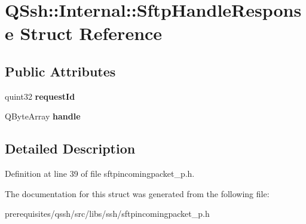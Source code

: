 \hypertarget{struct_q_ssh_1_1_internal_1_1_sftp_handle_response}{}\section{Q\+Ssh\+:\+:Internal\+:\+:Sftp\+Handle\+Response Struct Reference}
\label{struct_q_ssh_1_1_internal_1_1_sftp_handle_response}
\subsection*{Public Attributes}
\begin{DoxyCompactItemize}
\item 
\mbox{\label{struct_q_ssh_1_1_internal_1_1_sftp_handle_response_abd4c9c69aa6748f97cc4c4f96c872365}} 
quint32 {\bfseries request\+Id}
\item 
\mbox{\label{struct_q_ssh_1_1_internal_1_1_sftp_handle_response_a7ecc5e1ed637d582816d18e12c996cb1}} 
Q\+Byte\+Array {\bfseries handle}
\end{DoxyCompactItemize}


\subsection{Detailed Description}


Definition at line 39 of file sftpincomingpacket\+\_\+p.\+h.



The documentation for this struct was generated from the following file\+:\begin{DoxyCompactItemize}
\item 
prerequisites/qssh/src/libs/ssh/sftpincomingpacket\+\_\+p.\+h\end{DoxyCompactItemize}
